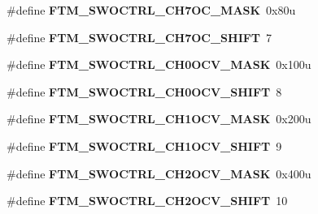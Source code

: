 \begin{DoxyCompactItemize}
\item 
\#define {\bfseries F\+T\+M\+\_\+\+S\+W\+O\+C\+T\+R\+L\+\_\+\+C\+H7\+O\+C\+\_\+\+M\+A\+SK}~0x80u\hypertarget{group__FTM__Register__Masks_gad27d690f6ab9c6c159c25ca2375a25a4}{}\label{group__FTM__Register__Masks_gad27d690f6ab9c6c159c25ca2375a25a4}

\item 
\#define {\bfseries F\+T\+M\+\_\+\+S\+W\+O\+C\+T\+R\+L\+\_\+\+C\+H7\+O\+C\+\_\+\+S\+H\+I\+FT}~7\hypertarget{group__FTM__Register__Masks_gae136ec9e72708b9da0aec24219804269}{}\label{group__FTM__Register__Masks_gae136ec9e72708b9da0aec24219804269}

\item 
\#define {\bfseries F\+T\+M\+\_\+\+S\+W\+O\+C\+T\+R\+L\+\_\+\+C\+H0\+O\+C\+V\+\_\+\+M\+A\+SK}~0x100u\hypertarget{group__FTM__Register__Masks_ga83766e89cee45d6c03318d8031258d17}{}\label{group__FTM__Register__Masks_ga83766e89cee45d6c03318d8031258d17}

\item 
\#define {\bfseries F\+T\+M\+\_\+\+S\+W\+O\+C\+T\+R\+L\+\_\+\+C\+H0\+O\+C\+V\+\_\+\+S\+H\+I\+FT}~8\hypertarget{group__FTM__Register__Masks_gaa2983e96c36fff64f21bf488473f902d}{}\label{group__FTM__Register__Masks_gaa2983e96c36fff64f21bf488473f902d}

\item 
\#define {\bfseries F\+T\+M\+\_\+\+S\+W\+O\+C\+T\+R\+L\+\_\+\+C\+H1\+O\+C\+V\+\_\+\+M\+A\+SK}~0x200u\hypertarget{group__FTM__Register__Masks_gab32bd89d8a7fe488b8bdbbfc753a05aa}{}\label{group__FTM__Register__Masks_gab32bd89d8a7fe488b8bdbbfc753a05aa}

\item 
\#define {\bfseries F\+T\+M\+\_\+\+S\+W\+O\+C\+T\+R\+L\+\_\+\+C\+H1\+O\+C\+V\+\_\+\+S\+H\+I\+FT}~9\hypertarget{group__FTM__Register__Masks_ga277368cadfcfb45d0f011cfa5bba13c5}{}\label{group__FTM__Register__Masks_ga277368cadfcfb45d0f011cfa5bba13c5}

\item 
\#define {\bfseries F\+T\+M\+\_\+\+S\+W\+O\+C\+T\+R\+L\+\_\+\+C\+H2\+O\+C\+V\+\_\+\+M\+A\+SK}~0x400u\hypertarget{group__FTM__Register__Masks_gaa48e37bd5004ccb2bce43692fa0c1a80}{}\label{group__FTM__Register__Masks_gaa48e37bd5004ccb2bce43692fa0c1a80}

\item 
\#define {\bfseries F\+T\+M\+\_\+\+S\+W\+O\+C\+T\+R\+L\+\_\+\+C\+H2\+O\+C\+V\+\_\+\+S\+H\+I\+FT}~10\hypertarget{group__FTM__Register__Masks_ga000183d4ecd255b5497ec73ea76f5cbc}{}\label{group__FTM__Register__Masks_ga000183d4ecd255b5497ec73ea76f5cbc}


\end{DoxyCompactItemize}
